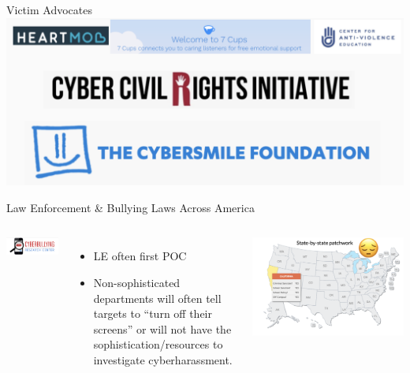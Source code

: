 \documentclass[nobackground,dvipsnames,table]{beamer}
\begin{document}
\begin{frame}{Victim Advocates}
    \includegraphics[width=\textwidth]{victim-advocates}
\end{frame}

\begin{frame}{Law Enforcement \& Bullying Laws Across America}
    \begin{columns}
            \includegraphics[width=\textwidth]{cyberbullying-research-center}
            \begin{itemize}
                \item LE often first POC
                \item Non-sophisticated departments will often tell targets to “turn off their screens” or will not have the sophistication/resources to investigate cyberharassment.
            \end{itemize}
            \includegraphics[width=\textwidth]{bullying-laws-map}
    \end{columns}
\end{frame}
\end{document}
